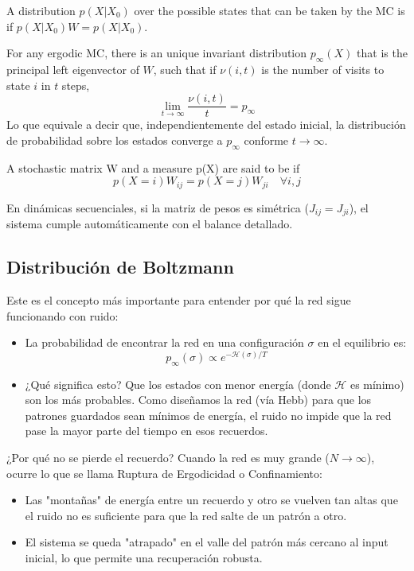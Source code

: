 \begin{definicion}[Invariance]
    A distribution $p(X|X_0 )$ over the possible states that can be taken by the MC is  if $p(X|X_0 )W = p(X|X_0 )$.
\end{definicion}

\begin{teo}
    For any ergodic MC, there is an unique invariant distribution $p_{\infty} (X)$ that is the principal left eigenvector of $W$, such that if $\nu(i, t)$ is the number of visits to state $i$ in $t$ steps,
    \begin{equation*}
        \lim_{t\to\infty} \dfrac{\nu(i,t)}{t} = p_{\infty}
    \end{equation*}
    Lo que equivale a decir que, independientemente del estado inicial, la distribución de probabilidad sobre los estados converge a $p_{\infty}$ conforme $t \to \infty$.
\end{teo}

\begin{definicion}
    A stochastic matrix W and a measure p(X) are said to be  if 
    \begin{equation*}
        p(X = i)W_{ij} = p(X = j)W_{ji} \quad \forall i, j
    \end{equation*}
\end{definicion}
\noindent
En dinámicas secuenciales, si la matriz de pesos es simétrica ($J_{ij} = J_{ji}$), el sistema cumple automáticamente con el balance detallado.

\subsection{Distribución de Boltzmann}
\noindent
Este es el concepto más importante para entender por qué la red sigue funcionando con ruido:

\begin{itemize}
    \item La probabilidad de encontrar la red en una configuración $\sigma$ en el equilibrio es:$$p_{\infty}(\sigma) \propto e^{-\mathcal{H}(\sigma)/T}$$
    \item ¿Qué significa esto? Que los estados con menor energía (donde $\mathcal{H}$ es mínimo) son los más probables. Como diseñamos la red (vía Hebb) para que los patrones guardados sean mínimos de energía, el ruido no impide que la red pase la mayor parte del tiempo en esos recuerdos.
\end{itemize}

\noindent
¿Por qué no se pierde el recuerdo? Cuando la red es muy grande ($N \to \infty$), ocurre lo que se llama Ruptura de Ergodicidad o Confinamiento:
\begin{itemize}
    \item Las "montañas" de energía entre un recuerdo y otro se vuelven tan altas que el ruido no es suficiente para que la red salte de un patrón a otro.
    \item El sistema se queda "atrapado" en el valle del patrón más cercano al input inicial, lo que permite una recuperación robusta.
\end{itemize}


